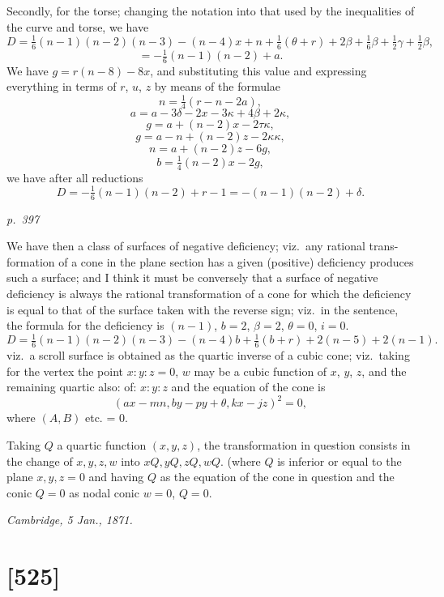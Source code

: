\documentclass[11pt,a4paper]{article}
\theoremstyle{plain}
\theoremstyle{definition}
\begin{document}
Secondly, for the torse; changing the notation into that used by the inequalities
of the curve and torse, we have
\[
D = \tfrac{1}{6}(n - 1)(n - 2)(n - 3) - (n - 4)x + n + \tfrac{1}{6}(\theta + r) + 2\beta + \tfrac{1}{6}\beta + \tfrac{1}{2}\gamma + \tfrac{1}{2}\beta,
\]
\[
= -\tfrac{1}{6}(n - 1)(n - 2) + a.
\]
We have $g = r(n - 8) - 8x$, and substituting this value and expressing everything in
terms of $r$, $u$, $z$ by means of the formulae
\[
n = \tfrac{1}{4}(r - n - 2 a),
\]
\[
a = a - 3\delta - 2x - 3 \kappa + 4 \beta + 2 \kappa,
\]
\[
g = a + (n - 2)x - 2\tau \kappa,
\]
\[
g = a - n + (n - 2) z - 2 \kappa \kappa,
\]
\[
n = a + (n - 2) z - 6 g,
\]
\[
b = \tfrac{1}{4}(n - 2)x - 2 g,
\]
we have after all reductions
\[
D = -\tfrac{1}{6}(n - 1)(n - 2) + r - 1 = -(n - 1)(n - 2) + \delta.
\]

\clearpage

\bigskip
\textit{p.~397}
\smallskip

\noindent
We have then a class of surfaces of negative deficiency; viz.\ any rational trans-
formation of a cone in the plane section has a given (positive) deficiency produces
such a surface; and I think it must be conversely that a surface of
negative deficiency is always the rational transformation of a cone for which the
deficiency is equal to that of the surface taken with the reverse sign; viz.\ in the
sentence, the formula for the deficiency is $(n - 1)$, $b = 2$, $\beta = 2$, $\theta = 0$, $i = 0$.
\[
D = \tfrac{1}{6}(n - 1)(n - 2)(n - 3) - (n - 4)b + \tfrac{1}{6}(b + r) + 2(n - 5) + 2(n - 1).
\]
viz.\ a scroll surface is obtained as the quartic inverse of a cubic cone; viz.\ taking
for the vertex the point $x : y : z = 0$, $w$ may be a cubic function of $x$, $y$, $z$, and the
remaining quartic also: of: $x : y : z$ and the equation of the cone is
\[
(ax - mn, by - py + \theta, kx - jz)^2 = 0,
\]
where $(A, B)$ etc. = 0.

Taking $Q$ a quartic function $(x, y, z)$, the transformation in question consists in
the change of $x, y, z, w$ into $xQ, yQ, zQ, wQ$.  (where $Q$ is inferior or equal to the
plane $x, y, z = 0$ and having $Q$ as the equation of the cone in
question and the conic $Q = 0$ as nodal conic $w = 0$, $Q = 0$.

\noindent\textit{Cambridge, 5 Jan., 1871.}

\clearpage

\section{[525]}
\end{document}
